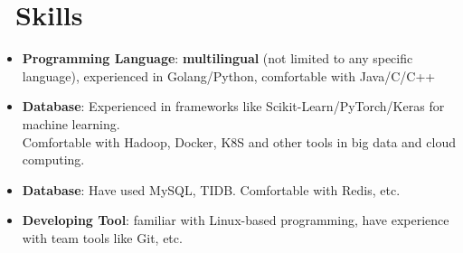 \documentclass{resume}
\newcommand{\en}[1]{#1}
\newcommand{\zh}[1]{}
\begin{document}


\section{\faCogs\ \en{Skills}\zh{技能}}
\begin{itemize}[parsep=0.25ex]
      \item \en{\textbf{Programming Language}:
                  \textbf{multilingual} (not limited to any specific language), 
                  experienced in Golang/Python, 
                  comfortable with Java/C/C++}
            \zh{\textbf{编程语言}:
                  \textbf{泛语言}（编程不受特定语言限制），
                  熟悉 Golang/Python，
                  了解 Java/C/C++ 等}

      \item \en{\textbf{Database}:
                  Experienced in frameworks like Scikit-Learn/PyTorch/Keras for machine learning. \\
                  Comfortable with Hadoop, Docker, K8S and other tools in big data and cloud computing.}
            \zh{\textbf{技术框架}:
                  使用过与机器学习相关的 scikit-learn/pytorch/keras等框架\\
                  了解大数据、云计算中 Hadoop、Docker、K8S等工具}

      \item \en{\textbf{Database}:
                  Have used MySQL, TIDB. Comfortable with Redis, etc.}
            \zh{\textbf{数据库}:
                  使用过MySQL、TiDb了解Redis等}

      \item \en{\textbf{Developing Tool}:
                  familiar with Linux-based programming,
                  have experience with team tools like Git, etc.}
            \zh{\textbf{开发工具}:
                  熟悉 Linux，有 Git等团队协作工具的使用经验}

\end{itemize}
\end{document}
